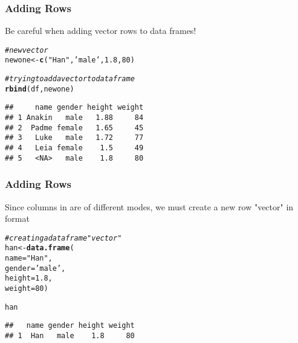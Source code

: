 \documentclass[12pt]{beamer}\usepackage[]{graphicx}\usepackage[]{color}
\makeatletter
\newcommand{\hlnum}[1]{\textcolor[rgb]{0.686,0.059,0.569}{#1}}%
\newcommand{\hlstr}[1]{\textcolor[rgb]{0.192,0.494,0.8}{#1}}%
\newcommand{\hlcom}[1]{\textcolor[rgb]{0.678,0.584,0.686}{\textit{#1}}}%
\newcommand{\hlstd}[1]{\textcolor[rgb]{0.345,0.345,0.345}{#1}}%
\newcommand{\hlkwb}[1]{\textcolor[rgb]{0.69,0.353,0.396}{#1}}%
\newcommand{\hlkwc}[1]{\textcolor[rgb]{0.333,0.667,0.333}{#1}}%
\newcommand{\hlkwd}[1]{\textcolor[rgb]{0.737,0.353,0.396}{\textbf{#1}}}%
\newenvironment{kframe}{%
 \def\at@end@of@kframe{}%
 \ifinner\ifhmode%
  \def\at@end@of@kframe{\end{minipage}}%
  \begin{minipage}{\columnwidth}%
 \fi\fi%
 \def\FrameCommand##1{\hskip\@totalleftmargin \hskip-\fboxsep
 \colorbox{shadecolor}{##1}\hskip-\fboxsep
     \hskip-\linewidth \hskip-\@totalleftmargin \hskip\columnwidth}%
 \MakeFramed {\advance\hsize-\width
   \@totalleftmargin\z@ \linewidth\hsize
   \@setminipage}}%
 {\par\unskip\endMakeFramed%
 \at@end@of@kframe}
\newenvironment{knitrout}{}{} %
\makeatother
\begin{document}
\begin{frame}[fragile]
\frametitle{Adding Rows}

Be careful when adding vector rows to data frames!
\begin{knitrout}\footnotesize
{}\color{fgcolor}\begin{kframe}
\begin{alltt}
\hlcom{# new vector}
\hlstd{newone} \hlkwb{<-} \hlkwd{c}\hlstd{(}\hlstr{"Han"}\hlstd{,} \hlstr{'male'}\hlstd{,} \hlnum{1.8}\hlstd{,} \hlnum{80}\hlstd{)}

\hlcom{# trying to add a vector to data frame}
\hlkwd{rbind}\hlstd{(df, newone)}
\end{alltt}


{\ttfamily\noindent\color{warningcolor}{\#\# Warning in `[<-.factor`(`*tmp*`, ri, value = "{}Han"{}): invalid factor level, NA generated}}\begin{verbatim}
##     name gender height weight
## 1 Anakin   male   1.88     84
## 2  Padme female   1.65     45
## 3   Luke   male   1.72     77
## 4   Leia female    1.5     49
## 5   <NA>   male    1.8     80
\end{verbatim}
\end{kframe}
\end{knitrout}

\end{frame}


\begin{frame}[fragile]
\frametitle{Adding Rows}

Since columns in  are of different modes, we must create a new row "vector" in  format
\begin{knitrout}\footnotesize
{}\color{fgcolor}\begin{kframe}
\begin{alltt}
\hlcom{# creating a data frame "vector"}
\hlstd{han} \hlkwb{<-} \hlkwd{data.frame}\hlstd{(}
  \hlkwc{name} \hlstd{=} \hlstr{"Han"}\hlstd{,}
  \hlkwc{gender} \hlstd{=} \hlstr{'male'}\hlstd{,}
  \hlkwc{height} \hlstd{=} \hlnum{1.8}\hlstd{,}
  \hlkwc{weight} \hlstd{=} \hlnum{80}\hlstd{)}

\hlstd{han}
\end{alltt}
\begin{verbatim}
##   name gender height weight
## 1  Han   male    1.8     80
\end{verbatim}
\end{kframe}
\end{knitrout}

\end{frame}
\end{document}
